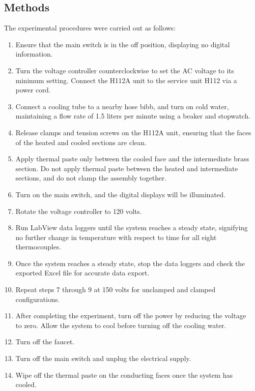 \documentclass[10pt,twocolumn]{article}
\begin{document}
\subsection{Methods}
\label{Methods}

The experimental procedures were carried out as follows:

\begin{enumerate}
    \item Ensure that the main switch is in the off position, displaying no digital information.
    \item Turn the voltage controller counterclockwise to set the AC voltage to its minimum setting. Connect the H112A unit to the service unit H112 via a power cord.
    \item Connect a cooling tube to a nearby hose bibb, and turn on cold water, maintaining a flow rate of 1.5 liters per minute using a beaker and stopwatch.
    \item Release clamps and tension screws on the H112A unit, ensuring that the faces of the heated and cooled sections are clean.
    \item Apply thermal paste only between the cooled face and the intermediate brass section. Do not apply thermal paste between the heated and intermediate sections, and do not clamp the assembly together.
    \item Turn on the main switch, and the digital displays will be illuminated.
    \item Rotate the voltage controller to 120 volts.
    \item Run LabView data loggers until the system reaches a steady state, signifying no further change in temperature with respect to time for all eight thermocouples.
    \item Once the system reaches a steady state, stop the data loggers and check the exported Excel file for accurate data export.
    \item Repeat steps 7 through 9 at 150 volts for unclamped and clamped configurations.
    \item After completing the experiment, turn off the power by reducing the voltage to zero. Allow the system to cool before turning off the cooling water.
    \item Turn off the faucet.
    \item Turn off the main switch and unplug the electrical supply.
    \item Wipe off the thermal paste on the conducting faces once the system has cooled.
\end{enumerate}
\end{document}
